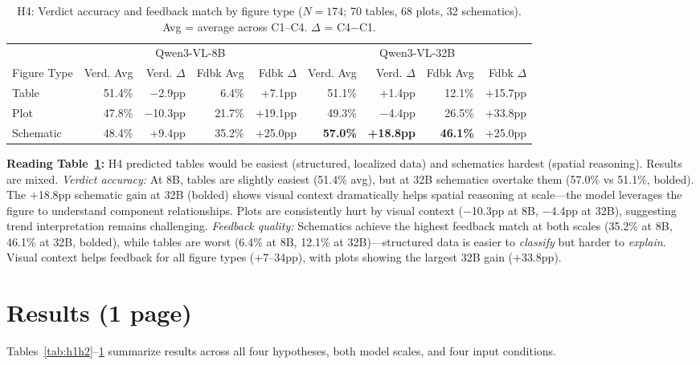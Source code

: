 \documentclass{article} %
\begin{document}
\begin{table}[H]
\centering
\small
\caption{H4: Verdict accuracy and feedback match by figure type ($N{=}174$; 70 tables, 68 plots, 32 schematics). Avg = average across C1--C4. $\Delta$ = C4$-$C1.}
\label{tab:h4}
\begin{tabular}{@{}lrrrrrrrr@{}}
\toprule
 & \multicolumn{4}{c}{Qwen3-VL-8B} & \multicolumn{4}{c}{Qwen3-VL-32B} \\
\cmidrule(lr){2-5} \cmidrule(l){6-9}
Figure Type & Verd. Avg & Verd. $\Delta$ & Fdbk Avg & Fdbk $\Delta$ & Verd. Avg & Verd. $\Delta$ & Fdbk Avg & Fdbk $\Delta$ \\
\midrule
Table       & 51.4\% & $-$2.9pp  & 6.4\%  & +7.1pp  & 51.1\% & +1.4pp           & 12.1\% & +15.7pp \\
Plot        & 47.8\% & $-$10.3pp & 21.7\% & +19.1pp & 49.3\% & $-$4.4pp         & 26.5\% & +33.8pp \\
Schematic   & 48.4\% & +9.4pp    & 35.2\% & +25.0pp & \textbf{57.0\%} & \textbf{+18.8pp} & \textbf{46.1\%} & +25.0pp \\
\bottomrule
\end{tabular}
\end{table}

\noindent\textbf{Reading Table~\ref{tab:h4}:} H4 predicted tables would be easiest (structured, localized data) and schematics hardest (spatial reasoning). Results are mixed. \textit{Verdict accuracy:} At 8B, tables are slightly easiest (51.4\% avg), but at 32B schematics overtake them (57.0\% vs 51.1\%, bolded). The $+$18.8pp schematic gain at 32B (bolded) shows visual context dramatically helps spatial reasoning at scale---the model leverages the figure to understand component relationships. Plots are consistently hurt by visual context ($-$10.3pp at 8B, $-$4.4pp at 32B), suggesting trend interpretation remains challenging. \textit{Feedback quality:} Schematics achieve the highest feedback match at both scales (35.2\% at 8B, 46.1\% at 32B, bolded), while tables are worst (6.4\% at 8B, 12.1\% at 32B)---structured data is easier to \textit{classify} but harder to \textit{explain}. Visual context helps feedback for all figure types ($+$7--34pp), with plots showing the largest 32B gain ($+$33.8pp).

\section{Results (1 page)}

Tables~\ref{tab:h1h2}--\ref{tab:h4} summarize results across all four hypotheses, both model scales, and four input conditions.
\end{document}
